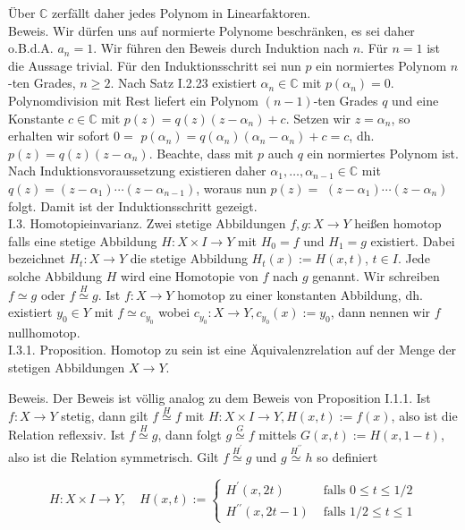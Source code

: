 \documentclass[10pt]{article}
\begin{document}
Über $\mathbb{C}$ zerfällt daher jedes Polynom in Linearfaktoren.\\
Beweis. Wir dürfen uns auf normierte Polynome beschränken, es sei daher o.B.d.A. $a_{n}=1$. Wir führen den Beweis durch Induktion nach $n$. Für $n=1$ ist die Aussage trivial. Für den Induktionsschritt sei nun $p$ ein normiertes Polynom $n$-ten Grades, $n \geq 2$. Nach Satz I.2.23 existiert $\alpha_{n} \in \mathbb{C}$ mit $p\left(\alpha_{n}\right)=0$. Polynomdivision mit Rest liefert ein Polynom $(n-1)$-ten Grades $q$ und eine Konstante $c \in \mathbb{C}$ mit $p(z)=q(z)\left(z-\alpha_{n}\right)+c$. Setzen wir $z=\alpha_{n}$, so erhalten wir sofort $0=$ $p\left(\alpha_{n}\right)=q\left(\alpha_{n}\right)\left(\alpha_{n}-\alpha_{n}\right)+c=c$, dh. $p(z)=q(z)\left(z-\alpha_{n}\right)$. Beachte, dass mit $p$ auch $q$ ein normiertes Polynom ist. Nach Induktionsvoraussetzung existieren daher $\alpha_{1}, \ldots, \alpha_{n-1} \in \mathbb{C}$ mit $q(z)=\left(z-\alpha_{1}\right) \cdots\left(z-\alpha_{n-1}\right)$, woraus nun $p(z)=$ $\left(z-\alpha_{1}\right) \cdots\left(z-\alpha_{n}\right)$ folgt. Damit ist der Induktionsschritt gezeigt.\\
I.3. Homotopieinvarianz. Zwei stetige Abbildungen $f, g: X \rightarrow Y$ heißen homotop falls eine stetige Abbildung $H: X \times I \rightarrow Y$ mit $H_{0}=f$ und $H_{1}=g$ existiert. Dabei bezeichnet $H_{t}: X \rightarrow Y$ die stetige Abbildung $H_{t}(x):=H(x, t)$, $t \in I$. Jede solche Abbildung $H$ wird eine Homotopie von $f$ nach $g$ genannt. Wir schreiben $f \simeq g$ oder $f \stackrel{H}{\simeq} g$. Ist $f: X \rightarrow Y$ homotop zu einer konstanten Abbildung, dh. existiert $y_{0} \in Y$ mit $f \simeq c_{y_{0}}$ wobei $c_{y_{0}}: X \rightarrow Y, c_{y_{0}}(x):=y_{0}$, dann nennen wir $f$ nullhomotop.\\
I.3.1. Proposition. Homotop zu sein ist eine Äquivalenzrelation auf der Menge der stetigen Abbildungen $X \rightarrow Y$.

Beweis. Der Beweis ist völlig analog zu dem Beweis von Proposition I.1.1. Ist $f: X \rightarrow Y$ stetig, dann gilt $f \stackrel{H}{\simeq} f$ mit $H: X \times I \rightarrow Y, H(x, t):=f(x)$, also ist die Relation reflexsiv. Ist $f \stackrel{H}{\simeq} g$, dann folgt $g \stackrel{G}{\simeq} f$ mittels $G(x, t):=H(x, 1-t)$, also ist die Relation symmetrisch. Gilt $f \stackrel{H^{\prime}}{\simeq} g$ und $g \stackrel{H^{\prime \prime}}{\simeq} h$ so definiert

$$
H: X \times I \rightarrow Y, \quad H(x, t):= \begin{cases}H^{\prime}(x, 2 t) & \text { falls } 0 \leq t \leq 1 / 2 \\ H^{\prime \prime}(x, 2 t-1) & \text { falls } 1 / 2 \leq t \leq 1\end{cases}
$$
\end{document}
